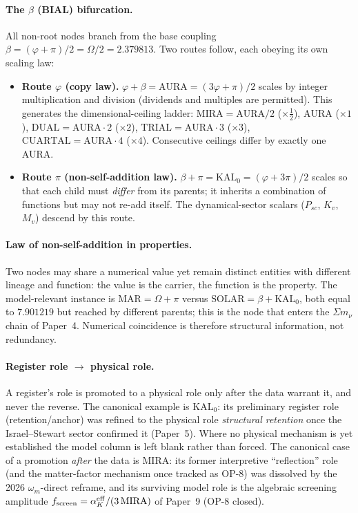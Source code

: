 \documentclass[12pt,a4paper]{article}
\begin{document}
\paragraph{The \texorpdfstring{$\beta$}{beta} (BIAL) bifurcation.}
All non-root nodes branch from the base coupling
$\beta=(\varphi+\pi)/2=\Omega/2=2.379813$. Two routes follow, each obeying its
own scaling law:
\begin{itemize}
  \item \textbf{Route $\varphi$ (copy law).} $\varphi+\beta=\mathrm{AURA}=(3\varphi+\pi)/2$
  scales by integer multiplication and division (dividends and multiples are
  permitted). This generates the dimensional-ceiling ladder:
  $\mathrm{MIRA}=\mathrm{AURA}/2$ ($\times\tfrac12$),
  $\mathrm{AURA}$ ($\times1$), $\mathrm{DUAL}=\mathrm{AURA}\cdot2$ ($\times2$),
  $\mathrm{TRIAL}=\mathrm{AURA}\cdot3$ ($\times3$),
  $\mathrm{CUARTAL}=\mathrm{AURA}\cdot4$ ($\times4$). Consecutive ceilings differ
  by exactly one AURA.
  \item \textbf{Route $\pi$ (non-self-addition law).} $\beta+\pi=\mathrm{KAL}_0=(\varphi+3\pi)/2$
  scales so that each child must \emph{differ} from its parents; it inherits a
  combination of functions but may not re-add itself. The dynamical-sector
  scalars ($P_{sc}$, $K_v$, $M_v$) descend by this route.
\end{itemize}

\paragraph{Law of non-self-addition in properties.}
Two nodes may share a numerical value yet remain distinct entities with
different lineage and function: the value is the carrier, the function is the
property. The model-relevant instance is
$\mathrm{MAR}=\Omega+\pi$ versus $\mathrm{SOLAR}=\beta+\mathrm{KAL}_0$, both equal
to $7.901219$ but reached by different parents; this is the node that enters the
$\Sigma m_\nu$ chain of Paper~4. Numerical coincidence is therefore structural
information, not redundancy.

\paragraph{Register role \texorpdfstring{$\to$}{->} physical role.}
A register's role is promoted to a physical role only after the data warrant
it, and never the reverse. The canonical example is $\mathrm{KAL}_0$: its
preliminary register role (retention/anchor) was refined to the physical role
\emph{structural retention} once the Israel--Stewart sector confirmed it
(Paper~5). Where no physical mechanism is yet established the model column is
left blank rather than forced. The canonical case of a promotion \emph{after}
the data is $\mathrm{MIRA}$: its former interpretive ``reflection'' role
(and the matter-factor mechanism once tracked as OP-8) was dissolved by the
2026 $\omega_m$-direct reframe, and its surviving model role is the algebraic
screening amplitude $f_{\rm screen}=\alpha_K^{\rm eff}/(3\,\mathrm{MIRA})$ of Paper~9
(OP-8 closed).
\end{document}
